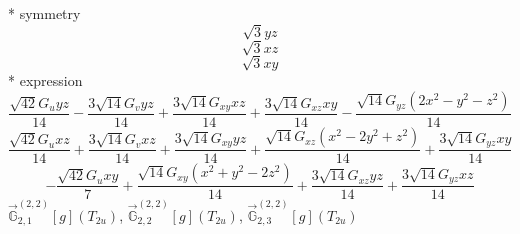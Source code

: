 \documentclass[fleqn,8pt]{jsarticle}
\begin{document}
\noindent\quad ** symmetry
\begin{dmath*}
\sqrt{3} y z
\end{dmath*}
\begin{dmath*}
\sqrt{3} x z
\end{dmath*}
\begin{dmath*}
\sqrt{3} x y
\end{dmath*}
\noindent\quad ** expression
\begin{dmath*}
\frac{\sqrt{42} G_{u} y z}{14} - \frac{3 \sqrt{14} G_{v} y z}{14} + \frac{3 \sqrt{14} G_{xy} x z}{14} + \frac{3 \sqrt{14} G_{xz} x y}{14} - \frac{\sqrt{14} G_{yz} \left(2 x^{2} - y^{2} - z^{2}\right)}{14}
\end{dmath*}
\begin{dmath*}
\frac{\sqrt{42} G_{u} x z}{14} + \frac{3 \sqrt{14} G_{v} x z}{14} + \frac{3 \sqrt{14} G_{xy} y z}{14} + \frac{\sqrt{14} G_{xz} \left(x^{2} - 2 y^{2} + z^{2}\right)}{14} + \frac{3 \sqrt{14} G_{yz} x y}{14}
\end{dmath*}
\begin{dmath*}
- \frac{\sqrt{42} G_{u} x y}{7} + \frac{\sqrt{14} G_{xy} \left(x^{2} + y^{2} - 2 z^{2}\right)}{14} + \frac{3 \sqrt{14} G_{xz} y z}{14} + \frac{3 \sqrt{14} G_{yz} x z}{14}
\end{dmath*}
\noindent\quad $\vec{\mathbb{G}}_{2,1}^{(2,2)}[g](T_{2u})$, $\vec{\mathbb{G}}_{2,2}^{(2,2)}[g](T_{2u})$, $\vec{\mathbb{G}}_{2,3}^{(2,2)}[g](T_{2u})$
\end{document}

